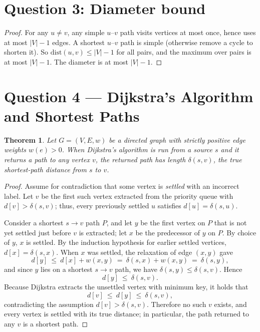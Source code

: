 \documentclass[11pt]{article}
\newtheorem{theorem}{Theorem}
\theoremstyle{definition}
\theoremstyle{remark}
\newcommand{\dist}{\mathrm{dist}}
\begin{document}
\section*{Question 3: Diameter bound}

\begin{proof}
For any $u\neq v$, any simple $u$–$v$ path visits vertices at most once, 
hence uses at most $|V|-1$ edges.
 A shortest $u$–$v$ path is simple (otherwise remove a cycle to shorten it). 
 So $\dist(u,v)\le |V|-1$ for all pairs, and the maximum over pairs is at most $|V|-1$.
 The diameter is at most $|V|-1$.
\end{proof}

\section*{Question 4 — Dijkstra’s Algorithm and Shortest Paths}

\begin{theorem}
Let $G=(V,E,w)$ be a directed graph with strictly positive edge weights $w(e)>0$. When Dijkstra’s algorithm is run from a source $s$ and it returns a path to any vertex $v$, the returned path has length $\delta(s,v)$, the true shortest-path distance from $s$ to $v$.
\end{theorem}

\begin{proof}
Assume for contradiction that some vertex is \emph{settled} with an incorrect label. 
Let $v$ be the first such vertex extracted from the priority queue with $d[v]>\delta(s,v)$;
 thus, every previously settled $u$ satisfies $d[u]=\delta(s,u)$.

Consider a shortest $s\!\to\! v$ path $P$, and let $y$ be the first vertex on $P$ that is not yet settled just before $v$ is extracted; let $x$ be the predecessor of $y$ on $P$. By choice of $y$, $x$ is settled. By the induction hypothesis for earlier settled vertices, $d[x]=\delta(s,x)$. When $x$ was settled, the relaxation of edge $(x,y)$ gave
\[
d[y]\ \le\ d[x]+w(x,y)\ =\ \delta(s,x)+w(x,y)\ =\ \delta(s,y),
\]
and since $y$ lies on a shortest $s\!\to\! v$ path, we have $\delta(s,y)\le \delta(s,v)$. Hence
\[
d[y]\ \le\ \delta(s,v).
\]
Because Dijkstra extracts the unsettled vertex with minimum key, it holds that
\[
d[v]\ \le\ d[y]\ \le\ \delta(s,v),
\]
contradicting the assumption $d[v]>\delta(s,v)$. Therefore no such $v$ exists, and every vertex is settled with its true distance; in particular, the path returned to any $v$ is a shortest path.
\end{proof}
\end{document}
